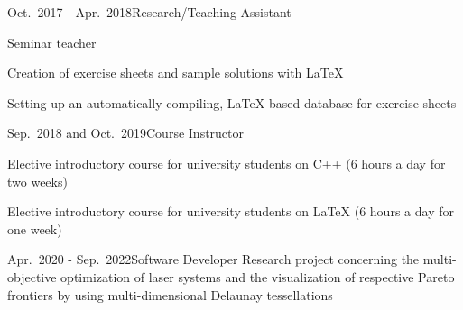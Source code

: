 \documentclass[a4paper,10pt]{cv}
\begin{document}
      \begin{cvTimeItem}{Oct.~2017 - Apr.~2018}{Research/Teaching Assistant}
        \begin{cvItemize}
          \item Seminar teacher 
          \item Creation of exercise sheets and sample solutions with LaTeX
          \item Setting up an automatically compiling, LaTeX-based database for exercise sheets
        \end{cvItemize}
      \end{cvTimeItem}
      \begin{cvTimeItem}{Sep.~2018 and Oct.~2019}{Course Instructor}
        \begin{cvItemize}
          \item Elective introductory course for university students on C++ (6 hours a day for two weeks)
          \item Elective introductory course for university students on LaTeX (6 hours a day for one week)
        \end{cvItemize}
      \end{cvTimeItem}

      \begin{cvTimeItem}{Apr.~2020 - Sep.~2022}{Software Developer}
        Research project concerning the multi-objective optimization of laser systems and the visualization of respective Pareto frontiers by using multi-dimensional Delaunay tessellations
      \end{cvTimeItem}
\end{document}
